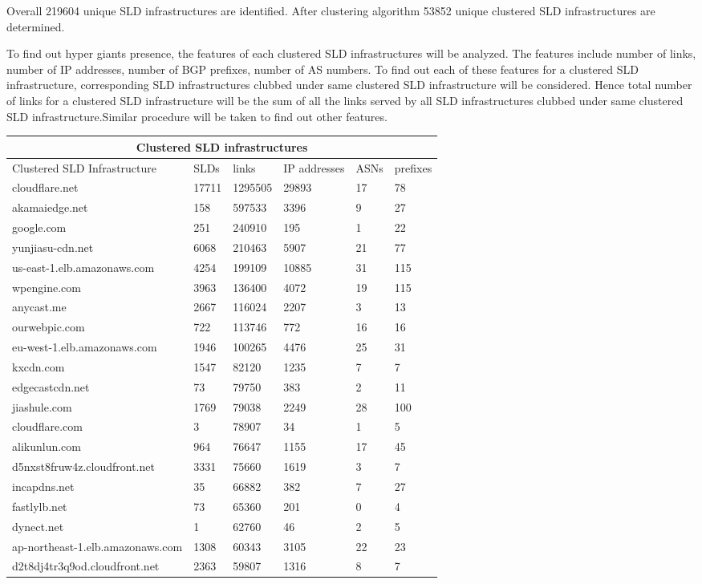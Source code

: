 Overall 219604 unique SLD infrastructures are identified. After clustering algorithm 53852 unique clustered SLD infrastructures are determined.

To find out hyper giants presence, the features of each clustered SLD infrastructures will be analyzed. The features include number of links, number of IP addresses, number of BGP prefixes, number of AS numbers. To find out each of these features for a  clustered SLD infrastructure, corresponding SLD infrastructures clubbed under same clustered SLD infrastructure will be considered. Hence total number of links for a clustered SLD infrastructure will be the sum of all the links served by all SLD infrastructures clubbed under same clustered SLD infrastructure.Similar procedure will be taken to find out other features.

\begin{tabular}{ |p{6cm}||p{1cm}||p{1cm}||p{1cm}||p{1cm}||p{1cm}| }
 \hline
 \multicolumn{6}{|c|}{Clustered SLD infrastructures} \\
 \hline
 Clustered SLD Infrastructure    & SLDs & links& IP addresses& ASNs& prefixes\\
 \hline
cloudflare.net& 17711& 1295505& 29893& 17 &78\\
akamaiedge.net& 158& 597533& 3396& 9 &27\\
google.com& 251& 240910& 195& 1&22\\
yunjiasu-cdn.net& 6068& 210463& 5907& 21&77\\
us-east-1.elb.amazonaws.com& 4254& 199109& 10885& 31&115\\
wpengine.com& 3963& 136400& 4072& 19&115\\
anycast.me& 2667& 116024& 2207& 3&13\\
ourwebpic.com& 722& 113746& 772& 16&16\\
eu-west-1.elb.amazonaws.com& 1946& 100265& 4476& 25&31\\
kxcdn.com& 1547& 82120& 1235& 7&7\\
edgecastcdn.net& 73& 79750& 383& 2&11\\
jiashule.com& 1769& 79038& 2249& 28&100\\
cloudflare.com& 3& 78907& 34& 1&5\\
alikunlun.com& 964& 76647& 1155& 17&45\\
d5nxst8fruw4z.cloudfront.net& 3331& 75660& 1619& 3&7\\
incapdns.net& 35& 66882& 382& 7&27\\
fastlylb.net& 73& 65360& 201& 0&4\\
dynect.net& 1& 62760& 46& 2&5\\
ap-northeast-1.elb.amazonaws.com& 1308& 60343& 3105& 22&23\\
d2t8dj4tr3q9od.cloudfront.net& 2363& 59807& 1316& 8&7\\
\hline
\end{tabular}
\newline

